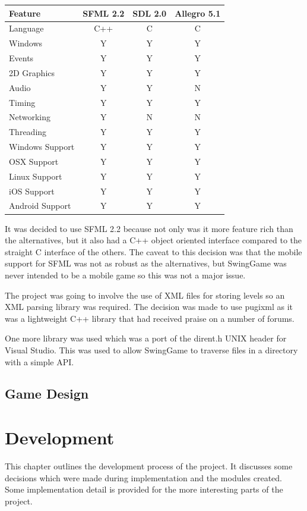 \documentclass[]{report}
\begin{document}
		\begin{tabular}[H]{ l || c | c | c }
			Feature & SFML 2.2\cite{sfml} & SDL 2.0\cite{sdl} & Allegro 5.1\cite{allegro} \\
			\hline
			\hline
			Language & C++ & C & C \\
			Windows & Y & Y  & Y \\
			Events & Y & Y & Y \\
			2D Graphics & Y & Y & Y \\
			Audio & Y & Y & N \\
			Timing & Y & Y & Y \\
			Networking & Y & N & N \\
			Threading & Y & Y & Y \\
			\hline
			Windows Support & Y & Y & Y \\
			OSX Support & Y & Y & Y \\
			Linux Support & Y & Y & Y \\
			iOS Support & Y\footnotemark & Y & Y \\
			Android Support &Y\footnotemark[1] & Y & Y \\
		\end{tabular}
		
		
		It was decided to use SFML 2.2\cite{sfml} because not only was it more feature rich than the alternatives, but it also had a C++ object oriented interface compared to the straight C interface of the others. The caveat to this decision was that the mobile support for SFML was not as robust as the alternatives, but SwingGame was never intended to be a mobile game so this was not a major issue.
		
		The project was going to involve the use of XML files for storing levels so an XML parsing library was required. The decision was made to use pugixml\cite{pugixml} as it was a lightweight C++ library that had received praise on a number of forums.
		
		One more library was used which was a port of the dirent.h UNIX header for Visual Studio\cite{dirent}. This was used to allow SwingGame to traverse files in a directory with a simple API.
		
	\section{Game Design}


\chapter{Development}
This chapter outlines the development process of the project. It discusses some decisions which were made during implementation and the modules created. Some implementation detail is provided for the more interesting parts of the project.
\end{document}
